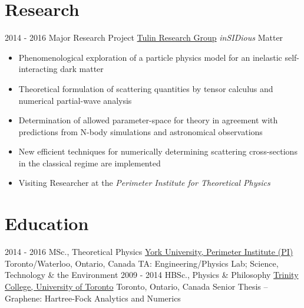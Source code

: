 \documentclass[letterpaper]{twentysecondcv} %
\begin{document}
\section{Research}
\begin{twenty}
	\twentyitem
    	{2014 - 2016}
        {Major Research Project}
        {\href{http://www.yorku.ca/stulin/research.html}{Tulin Research Group}}
        {\emph{inSIDious} Matter}
        {%
        \item{}
        \item{}
        }
        {\begin{itemize}
        \item Phenomenological exploration of a particle physics model for an inelastic self-interacting dark matter
        \item Theoretical formulation of scattering quantities by tensor calculus and numerical partial-wave analysis
        \item Determination of allowed parameter-space for theory in agreement with predictions from N-body simulations and astronomical observations
       	\item New efficient techniques for numerically determining scattering cross-sections in the classical regime are implemented
    	\item Visiting Researcher at the \emph{Perimeter Institute for Theoretical Physics}
		\end{itemize}}
\end{twenty}

\vfill

\section{Education}

\begin{twenty} %
	\twentyitem
    	{2014 - 2016}
        {MSc., Theoretical Physics}
        {\href{http://www.yorku.ca/}{York University, Perimeter Institute (PI)}}
        {Toronto/Waterloo, Ontario, Canada}
        {}
        {TA: Engineering/Physics Lab; Science, Technology \& the Environment}
	\twentyitem
    	{2009 - 2014}
        {HBSc., Physics \& Philosophy}
        {\href{https://www.utoronto.ca/}{Trinity College, University of Toronto}}
        {Toronto, Ontario, Canada}
        {}
        {Senior Thesis -- Graphene: Hartree-Fock Analytics and Numerics}
\end{twenty}
\end{document}
